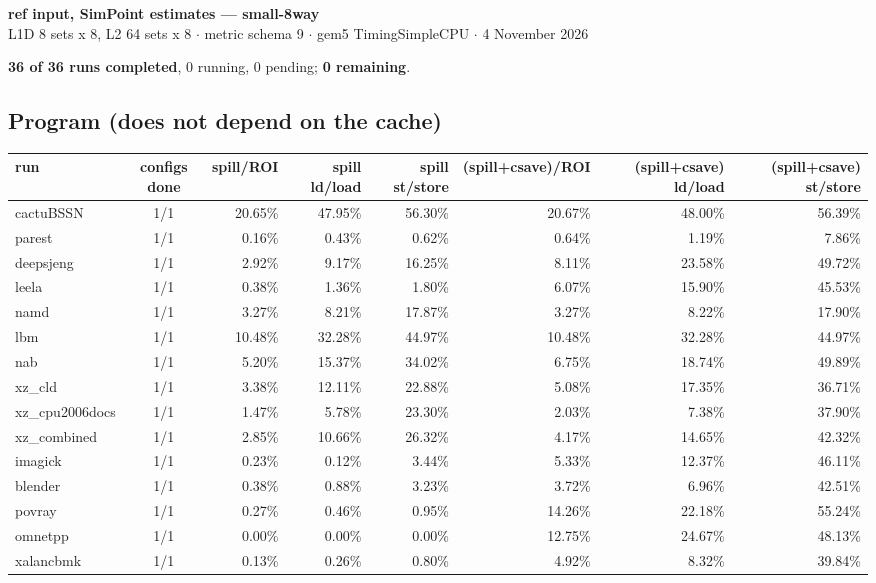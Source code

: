 \documentclass[10pt,a4paper,landscape]{article}
\begin{document}
\begin{center}
{\large\bfseries ref input, SimPoint estimates --- small-8way}\\[3pt]
{\small L1D 8 sets x 8, L2 64 sets x 8 $\cdot$ metric schema 9 $\cdot$ gem5 TimingSimpleCPU $\cdot$ 4 November 2026}
\end{center}
\textbf{36 of 36 runs completed}, 0 running, 0 pending; \textbf{0 remaining}.\par
\subsection*{Program (does not depend on the cache)}
{\footnotesize
\begin{longtable}{lcrrrrrr}
\toprule
run & configs done & spill/ROI & spill ld/load & spill st/store & (spill+csave)/ROI & (spill+csave) ld/load & (spill+csave) st/store \\
\midrule
\endhead
\bottomrule
\endfoot
cactuBSSN & 1/1 & 20.65\% & 47.95\% & 56.30\% & 20.67\% & 48.00\% & 56.39\% \\
parest & 1/1 & 0.16\% & 0.43\% & 0.62\% & 0.64\% & 1.19\% & 7.86\% \\
deepsjeng & 1/1 & 2.92\% & 9.17\% & 16.25\% & 8.11\% & 23.58\% & 49.72\% \\
leela & 1/1 & 0.38\% & 1.36\% & 1.80\% & 6.07\% & 15.90\% & 45.53\% \\
namd & 1/1 & 3.27\% & 8.21\% & 17.87\% & 3.27\% & 8.22\% & 17.90\% \\
lbm & 1/1 & 10.48\% & 32.28\% & 44.97\% & 10.48\% & 32.28\% & 44.97\% \\
nab & 1/1 & 5.20\% & 15.37\% & 34.02\% & 6.75\% & 18.74\% & 49.89\% \\
xz\_cld & 1/1 & 3.38\% & 12.11\% & 22.88\% & 5.08\% & 17.35\% & 36.71\% \\
xz\_cpu2006docs & 1/1 & 1.47\% & 5.78\% & 23.30\% & 2.03\% & 7.38\% & 37.90\% \\
xz\_combined & 1/1 & 2.85\% & 10.66\% & 26.32\% & 4.17\% & 14.65\% & 42.32\% \\
imagick & 1/1 & 0.23\% & 0.12\% & 3.44\% & 5.33\% & 12.37\% & 46.11\% \\
blender & 1/1 & 0.38\% & 0.88\% & 3.23\% & 3.72\% & 6.96\% & 42.51\% \\
povray & 1/1 & 0.27\% & 0.46\% & 0.95\% & 14.26\% & 22.18\% & 55.24\% \\
omnetpp & 1/1 & 0.00\% & 0.00\% & 0.00\% & 12.75\% & 24.67\% & 48.13\% \\
xalancbmk & 1/1 & 0.13\% & 0.26\% & 0.80\% & 4.92\% & 8.32\% & 39.84\% \\

\end{longtable}}
\end{document}

